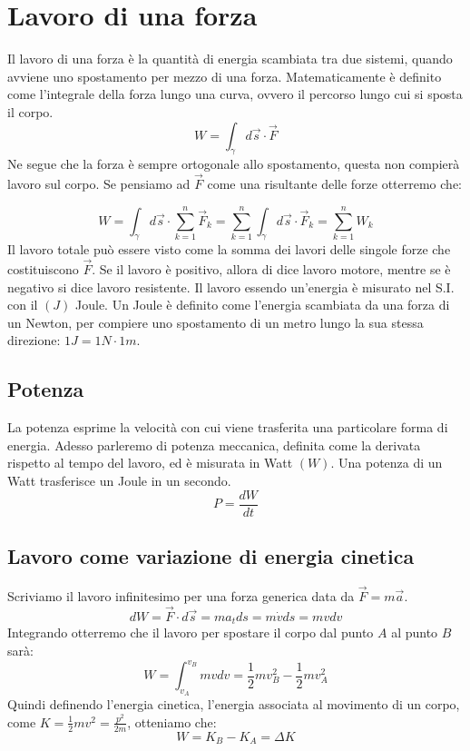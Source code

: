 \section{Lavoro di una forza}
Il lavoro di una forza è la quantità di energia scambiata tra due sistemi, quando avviene uno spostamento per mezzo di una forza. Matematicamente è definito come l'integrale della forza lungo una curva, ovvero il percorso lungo cui si sposta il corpo.
\begin{equation}
\boxed{W = \int_\gamma d\vec s \cdot \vec F}
\end{equation}
Ne segue che la forza è sempre ortogonale allo spostamento, questa non compierà lavoro sul corpo. Se pensiamo ad $\vec F$ come una risultante delle forze otterremo che:

\begin{equation}
W =  \int_\gamma d\vec s \cdot \sum_{k=1}^n\vec F_k = \sum_{k=1}^n \int_\gamma d\vec s \cdot \vec F_k = \sum_{k=1}^n W_k
\end{equation}
Il lavoro totale può essere visto come la somma dei lavori delle singole forze che costituiscono $\vec F$.
Se il lavoro è positivo, allora di dice lavoro motore, mentre se è negativo si dice lavoro resistente.
Il lavoro essendo un'energia è misurato nel S.I. con il $(J)$ Joule. Un Joule è definito come l'energia scambiata da una forza di un Newton, per compiere uno spostamento di un metro lungo la sua stessa direzione: $1J = 1N\cdot 1 m$. 

\subsection{Potenza}
La potenza esprime la velocità con cui viene trasferita una particolare forma di energia. Adesso parleremo di potenza meccanica, definita come la derivata rispetto al tempo del lavoro, ed è misurata in Watt $(W)$. Una potenza di un Watt trasferisce un Joule in un secondo.
\begin{equation}
\boxed{P=\frac{dW}{dt}}
\end{equation}

\subsection{Lavoro come variazione di energia cinetica}
Scriviamo il lavoro infinitesimo per una forza generica data da $\vec F = m\vec a$.
\begin{equation}
dW = \vec F\cdot d\vec s = ma_tds = m\dot v ds = mv dv 
\end{equation}
Integrando otterremo che il lavoro per spostare il corpo dal punto $A$ al punto $B$ sarà:
\begin{equation}
W = \int_{v_A}^{v_B}mvdv = \frac12mv_B^2- \frac12mv_A^2
\end{equation}
Quindi definendo l'energia cinetica, l'energia associata al movimento di un corpo, come $K = \frac12 mv^2=\frac{p^2}{2m}$, otteniamo che:
\begin{equation}
W = K_B - K_A = \Delta K
\end{equation}

